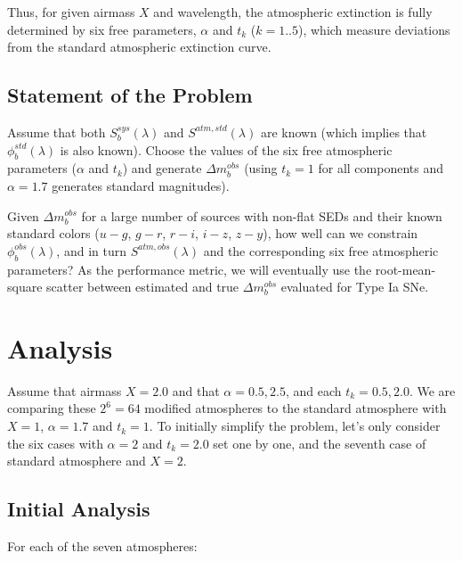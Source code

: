 \documentclass[12pt,preprint]{aastex}
\begin{document}
Thus, for given airmass $X$ and wavelength, the atmospheric extinction is fully determined
by six free parameters, $\alpha$ and $t_k$ ($k=1..5$), which measure deviations from the
standard atmospheric extinction curve. 



\subsection{Statement of the Problem} 

Assume that both $S^{sys}_b(\lambda)$ and $S^{atm,std}(\lambda)$ are known (which
implies that $\phi_b^{std}(\lambda)$ is also known). Choose the values of the six free 
atmospheric parameters ($\alpha$ and $t_k$) and generate $\Delta m_b^{obs}$
(using $t_k=1$ for all components and $\alpha=1.7$ generates standard magnitudes). 

Given $\Delta m_b^{obs}$ for a large number of sources with non-flat SEDs
and their known standard colors ($u-g$, $g-r$, $r-i$, $i-z$, $z-y$), how well can we
constrain $\phi_b^{obs}(\lambda)$, and in turn $S^{atm,obs}(\lambda)$ and the corresponding 
six free atmospheric parameters?  As the performance metric, we will eventually use the 
root-mean-square scatter between estimated and true $\Delta m_b^{obs}$ evaluated for Type Ia SNe. 



\section{Analysis} 

Assume that airmass $X=2.0$ and that $\alpha=0.5, 2.5$, and each $t_k=0.5, 2.0$.
We are comparing these $2^6 = 64$ modified atmospheres to the standard atmosphere
with $X=1$, $\alpha=1.7$ and $t_k=1$. To initially simplify the problem, let's only
consider the six cases with $\alpha=2$ and $t_k=2.0$ set one by one, and the 
seventh case of standard atmosphere and $X=2$. 


\subsection{Initial Analysis} 

For each of the seven atmospheres: 
\end{document}
